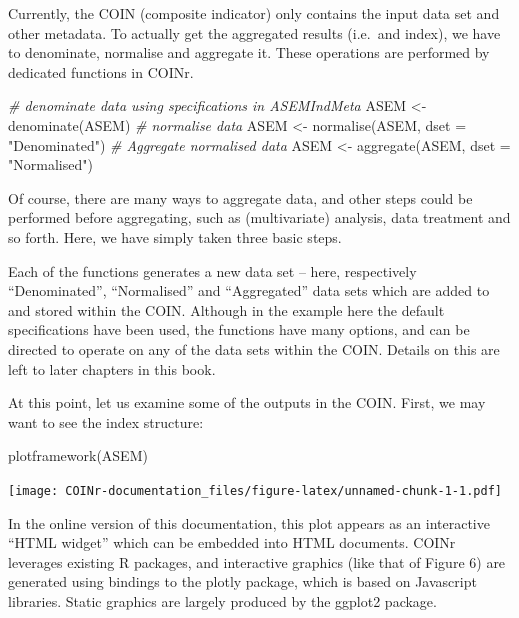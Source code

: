 \documentclass[
]{book}
\newenvironment{Shaded}{\begin{snugshade}}{\end{snugshade}}
\newcommand{\AttributeTok}[1]{\textcolor[rgb]{0.77,0.63,0.00}{#1}}
\newcommand{\CommentTok}[1]{\textcolor[rgb]{0.56,0.35,0.01}{\textit{#1}}}
\newcommand{\FunctionTok}[1]{\textcolor[rgb]{0.00,0.00,0.00}{#1}}
\newcommand{\NormalTok}[1]{#1}
\newcommand{\OtherTok}[1]{\textcolor[rgb]{0.56,0.35,0.01}{#1}}
\newcommand{\StringTok}[1]{\textcolor[rgb]{0.31,0.60,0.02}{#1}}
\begin{document}
Currently, the COIN (composite indicator) only contains the input data set and other metadata. To actually get the aggregated results (i.e.~and index), we have to denominate, normalise and aggregate it. These operations are performed by dedicated functions in COINr.

\begin{Shaded}
\begin{Highlighting}[]

\CommentTok{\# denominate data using specifications in ASEMIndMeta}
\NormalTok{ASEM }\OtherTok{\textless{}{-}} \FunctionTok{denominate}\NormalTok{(ASEM)}
\CommentTok{\# normalise data}
\NormalTok{ASEM }\OtherTok{\textless{}{-}} \FunctionTok{normalise}\NormalTok{(ASEM, }\AttributeTok{dset =} \StringTok{"Denominated"}\NormalTok{)}
\CommentTok{\# Aggregate normalised data}
\NormalTok{ASEM }\OtherTok{\textless{}{-}} \FunctionTok{aggregate}\NormalTok{(ASEM, }\AttributeTok{dset =} \StringTok{"Normalised"}\NormalTok{)}
\end{Highlighting}
\end{Shaded}

Of course, there are many ways to aggregate data, and other steps could be performed before aggregating, such as (multivariate) analysis, data treatment and so forth. Here, we have simply taken three basic steps.

Each of the functions generates a new data set -- here, respectively ``Denominated'', ``Normalised'' and ``Aggregated'' data sets which are added to and stored within the COIN. Although in the example here the default specifications have been used, the functions have many options, and can be directed to operate on any of the data sets within the COIN. Details on this are left to later chapters in this book.

At this point, let us examine some of the outputs in the COIN. First, we may want to see the index structure:

\begin{Shaded}
\begin{Highlighting}[]
\FunctionTok{plotframework}\NormalTok{(ASEM)}
\end{Highlighting}
\end{Shaded}

\texttt{[image: COINr-documentation\_files/figure-latex/unnamed-chunk-1-1.pdf]}

In the online version of this documentation, this plot appears as an interactive ``HTML widget'' which can be embedded into HTML documents. COINr leverages existing R packages, and interactive graphics (like that of Figure 6) are generated using bindings to the plotly package, which is based on Javascript libraries. Static graphics are largely produced by the ggplot2 package.
\end{document}
